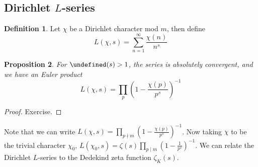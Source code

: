 \documentclass[11pt]{article}
\theoremstyle{definition}
\newtheorem{definition}{Definition}[section]
\theoremstyle{plain}
\newtheorem{proposition}[definition]{Proposition}
\theoremstyle{remark}
\let\Re\undefined
\DeclareMathOperator{\Re}{Re}
\begin{document}
\subsection{Dirichlet \texorpdfstring{$L$}{L}-series}

\begin{definition}\label{def:7_15}
    Let $\chi$ be a Dirichlet character mod $m$, then define
    \begin{equation*}
        L(\chi, s) = \sum_{n=1}^\infty \frac{\chi(n)}{n^s}
    \end{equation*}
\end{definition}

\begin{proposition}\label{prop:7_16}
    For $\Re(s) > 1$, the series is absolutely convergent, and we have an Euler product
    \begin{equation*}
        L(\chi, s) = \prod_p \left(1 - \frac{\chi(p)}{p^s}\right)^{-1}
    \end{equation*}
\end{proposition}
\begin{proof}
    Exercise.
\end{proof}

Note that we can write $L(\chi,s) = \prod_{p \nmid m} \left(1 - \frac{\chi(p)}{p^s}\right)^{-1}$. Now taking $\chi$ to be the trivial character $\chi_0$, $L(\chi_0,s) = \zeta(s) \prod_{p \mid m} \left(1 - \frac{1}{p^s}\right)^{-1}$. We can relate the Dirichlet $L$-series to the Dedekind zeta function $\zeta_K(s)$.
\end{document}
